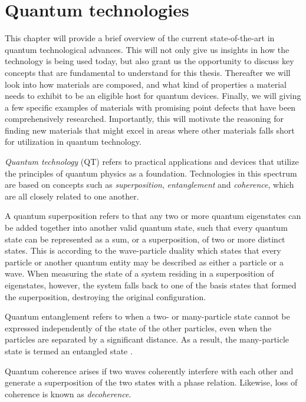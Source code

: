 \chapter{Quantum technologies}

This chapter will provide a brief overview of the current state-of-the-art in quantum technological advances. This will not only give us insights in how the technology is being used today, but also grant us the opportunity to discuss key concepts that are fundamental to understand for this thesis. Thereafter we will look into how materials are composed, and what kind of properties a material needs to exhibit to be an eligible host for quantum devices. Finally, we will giving a few specific examples of materials with promising point defects that have been comprehensively researched. Importantly, this will motivate the reasoning for finding new materials that might excel in areas where other materials falls short for utilization in quantum technology.

\textit{Quantum technology} (QT) refers to practical applications and devices that utilize the principles of quantum physics as a foundation. Technologies in this spectrum are based on concepts such as \textit{superposition}, \textit{entanglement} and \textit{coherence}, which are all closely related to one another.

A quantum superposition refers to that any two or more quantum eigenstates can be added together into another valid quantum state, such that every quantum state can be represented as a sum, or a superposition, of two or more distinct states. This is according to the wave-particle duality which states that every particle or another quantum entity may be described as either a particle or a wave. When measuring the state of a system residing in a superposition of eigenstates, however, the system falls back to one of the basis states that formed the superposition, destroying the original configuration.

Quantum entanglement refers to when a two- or many-particle state cannot be expressed independently of the state of the other particles, even when the particles are separated by a significant distance. As a result, the many-particle state is termed an entangled state \cite{Griffiths2017}.

Quantum coherence arises if two waves coherently interfere with each other and generate a superposition of the two states with a phase relation. Likewise, loss of coherence is known as \textit{decoherence}.

